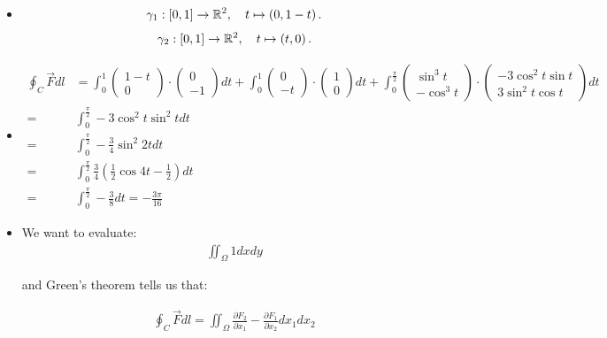 \documentclass[11pt]{article}
\begin{document}
\begin{solution}     
\begin{itemize}
\item\begin{align*}
        \gamma_1 : \left[0,1\right] \to \mathbb{R}^2, \quad t \mapsto \left( 0, 1-t \right).
    \end{align*}
\begin{align*}
        \gamma_2 : \left[0,1\right] \to \mathbb{R}^2, \quad t \mapsto \left( t, 0 \right).
    \end{align*}
\item \begin{align*}
\oint_C \vec F dl &= \int_0^1 \begin{pmatrix} 1-t\\ 0\end{pmatrix}\cdot \begin{pmatrix} 0\\ -1\end{pmatrix}dt +  \int_0^1 \begin{pmatrix} 0\\ -t\end{pmatrix}\cdot \begin{pmatrix} 1\\ 0\end{pmatrix}dt +  \int_0^{\frac{\pi}{2}} \begin{pmatrix} \sin^3t\\ -\cos^3 t\end{pmatrix}\cdot \begin{pmatrix} -3\cos^2 t \sin t\\ 3\sin^2 t \cos t\end{pmatrix}dt\\
=&\int_0^{\frac{\pi}{2}} -3\cos^2 t\sin^2 tdt\\
=&\int_0^{\frac{\pi}{2}} -\frac{3}{4}\sin^2 2t dt\\
=&\int_0^{\frac{\pi}{2}} \frac{3}{4}\left(\frac{1}{2} \cos 4t - \frac{1}{2}\right)dt\\
=&\int_0^{\frac{\pi}{2}} -\frac{3}{8}dt = -\frac{3\pi}{16}
\end{align*}
\item We want to evaluate:
\begin{gather*}
\iint_{\Omega} 1 dxdy
\end{gather*}

and Green's theorem tells us that:

\begin{gather*}
\oint_C \vec F dl  = \iint_{\Omega} \frac{\partial F_2}{\partial x_1} - \frac{\partial F_1}{\partial x_2} dx_1dx_2
\end{gather*}


\end{itemize}
\end{solution}
\end{document}
